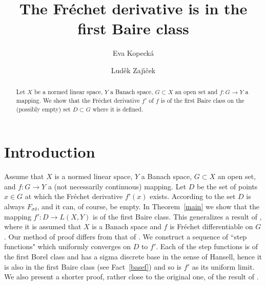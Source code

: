 \documentclass[12pt,a4paper]{amsart}
\theoremstyle{plain}
\theoremstyle{definition}
\theoremstyle{remark}
\numberwithin{equation}{section}
\begin{document}
 



\title[Fr\'echet Derivative]{The Fr\'echet derivative is in the first Baire class}





\author[E. Kopeck\'a]{ Eva Kopeck\'a}
\address{Department of Mathematics\\
   University of Innsbruck\\
 A-6020 Innsbruck, Austria}
\address{and}
\author[L. Zaj\'{\i}\v cek]{Lud\v ek  Zaj\'{\i}\v cek} 
 \address{ Charles University, Faculty of Mathematics and Physics \\
 Sokolovsk\'a 83, 186 75 Praha, Czech Republic}











\begin{abstract}
Let $X$ be a normed linear space, $Y$ a Banach  space, $G\subset X$ an 
open set and $f:G \to Y$ a  mapping. We show that the Fr\'echet derivative  $f'$ of $f$ is of the first Baire class on the (possibly empty)  set $D\subset G$ where it is defined.
\end{abstract}


 


\maketitle






 

\section*{Introduction}


Assume that  $X$ is a normed linear space, $Y$ a Banach  space, $G\subset X$ an 
open set, and $f:G \to Y$ a (not necessarily continuous) mapping. Let  $D$  be  
the set of points $x\in G$ at which the Fr\'echet derivative $f'(x)$ exists. According to \cite{Z} the set  $D$ is always $F_{\sigma\delta}$, and it can, of course,  be empty. In Theorem~\ref{main} we show that the mapping $f':D\to L(X,Y)$ is of the first Baire class. This generalizes a result of \cite{MS}, where 
 it is assumed 
 that $X$ is a Banach space and $f$ is  Fr\'echet differentiable on $G$. Our method of proof differs from that of \cite{MS}.  We construct a sequence of ``step functions" which uniformly converges on $D$ to $f'$. Each of the step functions is of the first Borel class and has  a sigma discrete  base in the sense of 
Hansell, hence it is also in the first Baire class (see Fact~\ref{basef})  and so is $f'$ as its uniform limit. We also present a shorter proof, rather close to the original one, of 
the result of \cite{MS}.    
\end{document}
